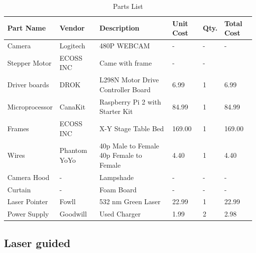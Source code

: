 \documentclass[12pt]{article}
\begin{document}
\begin{flushleft}
\begin{table}[ht!]
	\begin{center}	
		\begin{tabular}{|l|p{1.5cm}|p{4cm}|l|l|l|}
			\hline
			Part Name & Vendor & Description  & Unit Cost & Qty. & Total Cost \\ \hline
			Camera & Logitech & 480P WEBCAM & - & - & -\\ 
			\hline
			Stepper Motor & ECOSS INC & Came with frame & - & - &\\ 
			\hline
			Driver boards & DROK & L298N Motor Drive Controller Board & 6.99 & 1 & 6.99\\
			\hline
			Microprocessor & CanaKit & Raspberry Pi 2 with Starter Kit & 84.99 & 1 & 84.99\\
			\hline
			Frames & ECOSS INC & X-Y Stage Table Bed &  169.00 & 1 & 169.00\\
			\hline
			Wires & Phantom YoYo & 40p Male to Female 40p Female to Female & 4.40 & 1 & 4.40\\
			\hline
			Camera Hood & - & Lampshade & - & - & -\\
			\hline
			Curtain & - & Foam Board & - & - & -\\
			\hline
			Laser Pointer & Fowll & 532 nm Green Laser & 22.99 & 1 & 22.99\\
			\hline
			Power Supply & Goodwill & Used Charger & 1.99 & 2 & 2.98\\
			\hline
		\end{tabular}
		\caption{Parts List}
	\end{center}
\end{table}


\subsection{Laser guided}


\end{flushleft}
\end{document}
